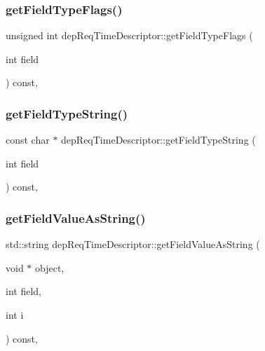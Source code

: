 \subsubsection{\texorpdfstring{get\+Field\+Type\+Flags()}{getFieldTypeFlags()}}
{\footnotesize\ttfamily unsigned int dep\+Req\+Time\+Descriptor\+::get\+Field\+Type\+Flags (\begin{DoxyParamCaption}\item[{int}]{field }\end{DoxyParamCaption}) const\hspace{0.3cm}{\ttfamily [override]}, {\ttfamily [virtual]}}

\mbox{\label{classdepReqTimeDescriptor_af28f6a1029b87177e101167d3fc89c3b}} 
\subsubsection{\texorpdfstring{get\+Field\+Type\+String()}{getFieldTypeString()}}
{\footnotesize\ttfamily const char $\ast$ dep\+Req\+Time\+Descriptor\+::get\+Field\+Type\+String (\begin{DoxyParamCaption}\item[{int}]{field }\end{DoxyParamCaption}) const\hspace{0.3cm}{\ttfamily [override]}, {\ttfamily [virtual]}}

\mbox{\label{classdepReqTimeDescriptor_a93ae2e8b0dece6757eabe758959988fd}} 
\subsubsection{\texorpdfstring{get\+Field\+Value\+As\+String()}{getFieldValueAsString()}}
{\footnotesize\ttfamily std\+::string dep\+Req\+Time\+Descriptor\+::get\+Field\+Value\+As\+String (\begin{DoxyParamCaption}\item[{void $\ast$}]{object,  }\item[{int}]{field,  }\item[{int}]{i }\end{DoxyParamCaption}) const\hspace{0.3cm}{\ttfamily [override]}, {\ttfamily [virtual]}}

